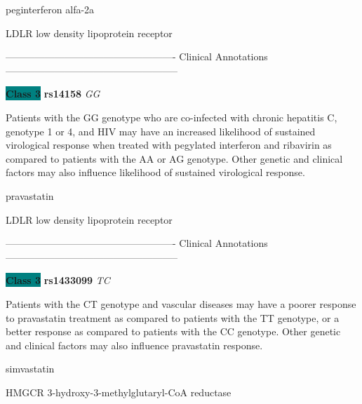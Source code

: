 \documentclass{resume} %
\begin{document}
\begin{rSection}{ peginterferon alfa-2a }
\begin{rSubsection}{ LDLR }{ low density lipoprotein receptor }{}{}
\item[]

\item[] ---------------------------------------------------- Clinical Annotations -----------------------------------------------------\newline
\item \textbf{\colorbox{teal} {Class 3}} \textbf{ rs14158 } \textit{ GG }
\item[] Patients with the GG genotype who are co-infected with chronic hepatitis C, genotype 1 or 4, and HIV may have an increased likelihood of sustained virological response when treated with pegylated interferon and ribavirin as compared to patients with the AA or AG genotype. Other genetic and clinical factors may also influence likelihood of sustained virological response. 
\end{rSubsection}

\end{rSection}\begin{rSection}{ pravastatin }
\item[]

\begin{rSubsection}{ LDLR }{ low density lipoprotein receptor }{}{}
\item[]

\item[] ---------------------------------------------------- Clinical Annotations -----------------------------------------------------\newline
\item \textbf{\colorbox{teal} {Class 3}} \textbf{ rs1433099 } \textit{ TC }
\item[] Patients with the CT genotype and vascular diseases may have a poorer response to pravastatin treatment as compared to patients with the TT genotype, or a better response as compared to patients with the CC genotype. Other genetic and clinical factors may also influence pravastatin response. 
\end{rSubsection}

\end{rSection}\begin{rSection}{ simvastatin }
\item[]

\begin{rSubsection}{ HMGCR }{ 3-hydroxy-3-methylglutaryl-CoA reductase }{}{}
\item[]


\end{rSubsection}
\end{rSection}
\end{document}
